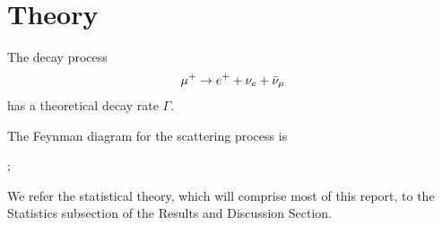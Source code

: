 \section*{Theory}
The decay process
\begin{align}
    \mu^+ \rightarrow e^+ + \nu_e + \Bar{\nu}_\mu
\end{align}
has a theoretical decay rate $\Gamma$. 

The Feynman diagram for the scattering process is
\begin{center}
    ; 
\end{center}

We refer the statistical theory, which will comprise most of this report, to the Statistics subsection of the Results and Discussion Section.
